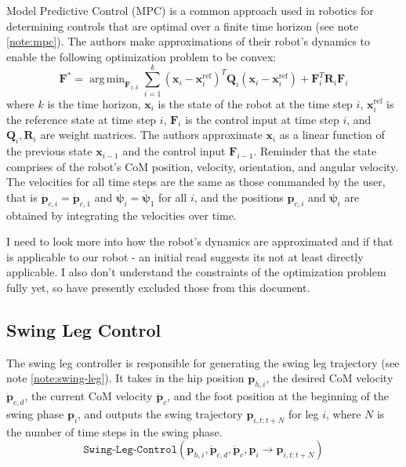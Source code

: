 \documentclass[12pt,a4paper]{article}
\theoremstyle{plain}
\theoremstyle{definition}
\theoremstyle{remark}
\newcounter{note}
\DeclareMathOperator*{\argmin}{arg\,min}
\begin{document}
Model Predictive Control (MPC) is a common approach used in robotics for determining controls that are optimal over a finite time horizon (see note \ref{note:mpc}). The authors make approximations of their robot's dynamics to enable the following optimization problem to be convex:
\[
\mathbf{F}^* = \argmin_{\mathbf{F}_{1:k}} \sum_{i=1}^{k} 
    (\mathbf{x}_i - \mathbf{x}_i^{\text{ref}})^T 
    \mathbf{Q}_i 
    (\mathbf{x}_i - \mathbf{x}_i^{\text{ref}})
    + 
    \mathbf{F}_i^T
    \mathbf{R}_i 
    \mathbf{F}_i
\]
where $k$ is the time horizon, $\mathbf{x}_i$ is the state of the robot at the time step $i$, $\mathbf{x}_i^{\text{ref}}$ is the reference state at time step $i$, $\mathbf{F}_i$ is the control input at time step $i$, and $\mathbf{Q}_i, \mathbf{R}_i$ are weight matrices. The authors approximate $\mathbf{x}_i$ as a linear function of the previous state $\mathbf{x}_{i-1}$ and the control input $\mathbf{F}_{i-1}$. Reminder that the state comprises of the robot's CoM position, velocity, orientation, and angular velocity. The velocities for all time steps are the same as those commanded by the user, that is $\mathbf{\dot{p}}_{c,i} = \mathbf{\dot{p}}_{c,1}$ and $\mathbf{\dot{\psi}}_i = \mathbf{\dot{\psi}}_1$ for all $i$, and the positions $\mathbf{p}_{c,i}$ and $\mathbf{\psi}_i$ are obtained by integrating the velocities over time.  
\begin{note}
    I need to look more into how the robot's dynamics are approximated and if that is applicable to our robot - an initial read suggests its not at least directly applicable. I also don't understand the constraints of the optimization problem fully yet, so have presently excluded those from this document. 
    \label{note:mpc}
\end{note}

\subsection{Swing Leg Control}

The swing leg controller is responsible for generating the swing leg trajectory (see note \ref{note:swing-leg}). It takes in the hip position $\mathbf{p}_{h,i}$, the desired CoM velocity ${\mathbf{\dot{p}}_{c,d}}$, the current CoM velocity ${\mathbf{\dot{p}}_c}$, and the foot position at the beginning of the swing phase $\mathbf{p}_i$, and outputs the swing trajectory $\mathbf{p}_{i, t:t+N}$ for leg $i$, where $N$ is the number of time steps in the swing phase.
\[ 
\texttt{Swing-Leg-Control}(\mathbf{p}_{h,i}, \mathbf{\dot{p}}_{c,d}, \mathbf{\dot{p}}_c, \mathbf{p}_i \rightarrow \mathbf{p}_{i, t:t+N})
\]
\end{document}
